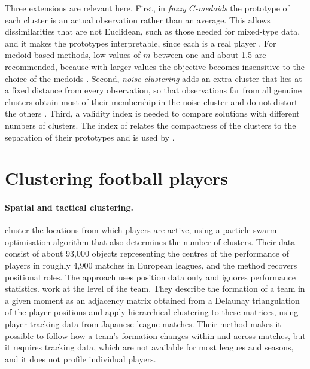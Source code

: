 Three extensions are relevant here. First, in \emph{fuzzy $C$-medoids} the prototype of each cluster is an actual observation rather than an average. This allows dissimilarities that are not Euclidean, such as those needed for mixed-type data, and it makes the prototypes interpretable, since each is a real player \cite{krishnapuram2001lowcomplexity}. For medoid-based methods, low values of $m$ between one and about 1.5 are recommended, because with larger values the objective becomes insensitive to the choice of the medoids \cite{durso2022robust}. Second, \emph{noise clustering} adds an extra cluster that lies at a fixed distance from every observation, so that observations far from all genuine clusters obtain most of their membership in the noise cluster and do not distort the others \cite{dave1991noise}. Third, a validity index is needed to compare solutions with different numbers of clusters. The index of  relates the compactness of the clusters to the separation of their prototypes and is used by .

\section{Clustering football players}
\label{sec:lit-football}

\paragraph{Spatial and tactical clustering.}  cluster the locations from which players are active, using a particle swarm optimisation algorithm that also determines the number of clusters. Their data consist of about 93,000 objects representing the centres of the performance of players in roughly 4,900 matches in European leagues, and the method recovers positional roles. The approach uses position data only and ignores performance statistics.  work at the level of the team. They describe the formation of a team in a given moment as an adjacency matrix obtained from a Delaunay triangulation of the player positions and apply hierarchical clustering to these matrices, using player tracking data from Japanese league matches. Their method makes it possible to follow how a team's formation changes within and across matches, but it requires tracking data, which are not available for most leagues and seasons, and it does not profile individual players.

